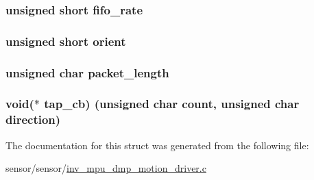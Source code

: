 \subsubsection[{\texorpdfstring{fifo\+\_\+rate}{fifo_rate}}]{\setlength{\rightskip}{0pt plus 5cm}unsigned short fifo\+\_\+rate}\hypertarget{structdmp__s_a4aec83107ddc0d95ddf30cce1b7e6465}{}\label{structdmp__s_a4aec83107ddc0d95ddf30cce1b7e6465}
\subsubsection[{\texorpdfstring{orient}{orient}}]{\setlength{\rightskip}{0pt plus 5cm}unsigned short orient}\hypertarget{structdmp__s_ac949b11ebfe17c3a2ac42785a1437c25}{}\label{structdmp__s_ac949b11ebfe17c3a2ac42785a1437c25}
\subsubsection[{\texorpdfstring{packet\+\_\+length}{packet_length}}]{\setlength{\rightskip}{0pt plus 5cm}unsigned char packet\+\_\+length}\hypertarget{structdmp__s_a6423143ff761c75d97f34c8465393ea0}{}\label{structdmp__s_a6423143ff761c75d97f34c8465393ea0}
\subsubsection[{\texorpdfstring{tap\+\_\+cb}{tap_cb}}]{\setlength{\rightskip}{0pt plus 5cm}void($\ast$ tap\+\_\+cb) (unsigned char count, unsigned char direction)}\hypertarget{structdmp__s_a45a59366dd83331a3ae376edeb5b9e94}{}\label{structdmp__s_a45a59366dd83331a3ae376edeb5b9e94}


The documentation for this struct was generated from the following file\+:\begin{DoxyCompactItemize}
\item 
sensor/sensor/\hyperlink{inv__mpu__dmp__motion__driver_8c}{inv\+\_\+mpu\+\_\+dmp\+\_\+motion\+\_\+driver.\+c}\end{DoxyCompactItemize}
